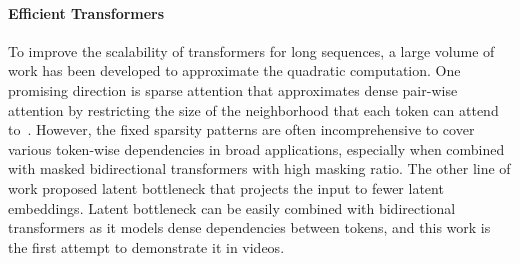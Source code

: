 \documentclass[10pt,twocolumn,letterpaper]{article}
\begin{document}
\paragraph{Efficient Transformers}
\label{sec:effi_transformers}
To improve the scalability of transformers for long sequences, a large volume of work has been developed to approximate the quadratic computation. 
One promising direction is sparse attention that approximates dense pair-wise attention by restricting the size of the neighborhood that each token can attend to~\cite{MaskViT, NUWA, CogVideo, BigBird, Ho2019, LongFormer}. 
However, the fixed sparsity patterns are often incomprehensive to cover various token-wise dependencies in broad applications, especially when combined with masked bidirectional transformers with high masking ratio.
The other line of work proposed latent bottleneck \cite{SetTransformer, SetVAE, LUNA, Perceiver, PerceiverIO} that projects the input to fewer latent embeddings. 
Latent bottleneck can be easily combined with bidirectional transformers as it models dense dependencies between tokens, and this work is the first attempt to demonstrate it in videos. 
%
\end{document}
